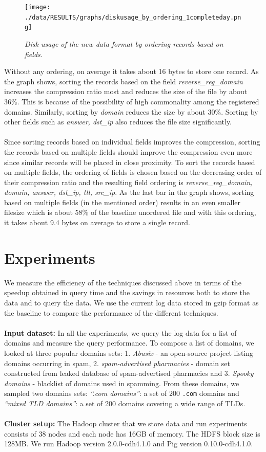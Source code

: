 \documentclass[11pt,a4paper]{article}
\begin{document}
\begin{figure}[H] 
\centering
\texttt{[image: ./data/RESULTS/graphs/diskusage\_by\_ordering\_1completeday.png]}
\caption {\textit{Disk usage of the new data format by ordering records based on fields.}}
\end{figure}

\noindent
Without any ordering, on average it takes about 16 bytes to store one record. As the graph shows, sorting the records based on the field \textit{reverse\_reg\_domain} increases the compression ratio most and reduces the size of the file by about 36\%. This is because of the possibility of high commonality among the registered domains. Similarly, sorting by \textit{domain} reduces the size by about 30\%. Sorting by other fields such as \textit{answer, dst\_ip} also reduces the file size significantly.
\\\\
Since sorting records based on individual fields improves the compression, sorting the records based on multiple fields should improve the compression even more since similar records will be placed in close proximity. To sort the records based on multiple fields, the ordering of fields is chosen based on the decreasing order of their compression ratio and the resulting field ordering is \textit{reverse\_reg\_domain, domain, answer, dst\_ip, ttl, src\_ip}. As the last bar in the graph shows, sorting based on multiple fields (in the mentioned order) results in an even smaller filesize which is about 58\% of the baseline unordered file and with this ordering, it takes about 9.4 bytes on average to store a single record.

\section {Experiments}
We measure the efficiency of the techniques discussed above in terms of the speedup obtained in query time and the savings in resources both to store the data and to query the data. We use the current log data stored in gzip format as the baseline to compare the performance of the different techniques.
\\\\
\textbf{Input dataset:} In all the experiments, we query the log data for a list of domains and measure the query performance. To compose a list of domains, we looked at three popular domains sets: 1. \textit{Abusix}\cite{abusix} - an open-source project listing domains occurring in spam, 2. \textit{spam-advertised pharmacies}\cite{pharmaleaks} - domain set constructed from leaked database of spam-advertised pharmacies and 3. \textit{Spooky domains}\cite{spooky} - blacklist of domains used in spamming.
From these domains, we sampled two domains sets: \textit{``.com domains''}: a set of 200 \texttt{.com} domains and \textit{``mixed TLD domains''}: a set of 200 domains covering a wide range of TLDs.
\\\\
\textbf{Cluster setup:} The Hadoop cluster that we store data and run experiments consists of 38 nodes and each node has 16GB of memory. The HDFS block size is 128MB. We run Hadoop version 2.0.0-cdh4.1.0 and Pig version 0.10.0-cdh4.1.0.
\end{document}
